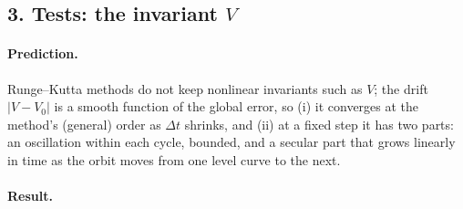 \documentclass[11pt,a4paper]{article}
\begin{document}
\newpage
\subsection*{3. Tests: the invariant $V$}

\paragraph{Prediction.} Runge--Kutta methods do not keep nonlinear invariants
such as $V$; the drift $|V - V_0|$ is a smooth function of the global error,
so (i) it converges at the method's (general) order as $\Delta t$ shrinks,
and (ii) at a fixed step it has two parts: an oscillation within each cycle,
bounded, and a secular part that grows linearly in time as the orbit moves
from one level curve to the next.

\paragraph{Result.}
\begin{center}
\small

\end{center}
\end{document}
